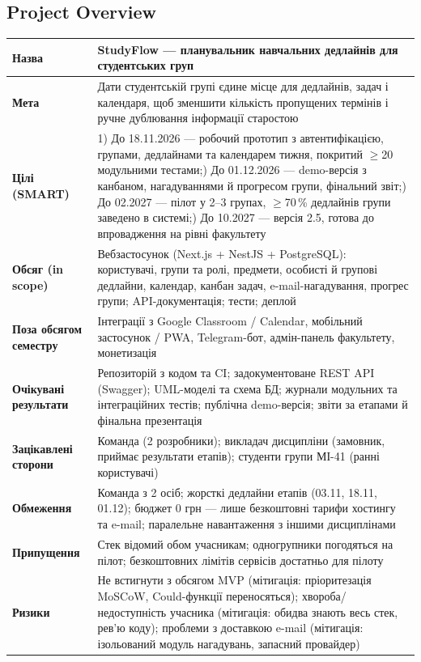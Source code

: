 \documentclass[12pt]{article}
\begin{document}
\subsection{Project Overview}
\begin{tabularx}{\textwidth}{L{3.4cm} Y}
\toprule
\textbf{Назва} & StudyFlow --- планувальник навчальних дедлайнів для студентських груп\\
\midrule
\textbf{Мета} & Дати студентській групі єдине місце для дедлайнів, задач і календаря, щоб зменшити кількість пропущених термінів і ручне дублювання інформації старостою\\
\midrule
\textbf{Цілі (SMART)} &
1) До 18.11.2026 --- робочий прототип з автентифікацією, групами, дедлайнами та календарем тижня, покритий $\geq$20 модульними тестами;) До 01.12.2026 --- demo-версія з канбаном, нагадуваннями й прогресом групи, фінальний звіт;) До 02.2027 --- пілот у 2--3 групах, $\geq$70\,\% дедлайнів групи заведено в системі;) До 10.2027 --- версія 2.5, готова до впровадження на рівні факультету\\
\midrule
\textbf{Обсяг (in scope)} & Вебзастосунок (Next.js + NestJS + PostgreSQL): користувачі, групи та ролі, предмети, особисті й групові дедлайни, календар, канбан задач, e-mail-нагадування, прогрес групи; API-документація; тести; деплой\\
\midrule
\textbf{Поза обсягом семестру} & Інтеграції з Google Classroom / Calendar, мобільний застосунок / PWA, Telegram-бот, адмін-панель факультету, монетизація\\
\midrule
\textbf{Очікувані результати} & Репозиторій з кодом та CI; задокументоване REST API (Swagger); UML-моделі та схема БД; журнали модульних та інтеграційних тестів; публічна demo-версія; звіти за етапами й фінальна презентація\\
\midrule
\textbf{Зацікавлені сторони} & Команда (2 розробники); викладач дисципліни (замовник, приймає результати етапів); студенти групи МІ-41 (ранні користувачі)\\
\midrule
\textbf{Обмеження} & Команда з 2 осіб; жорсткі дедлайни етапів (03.11, 18.11, 01.12); бюджет 0 грн --- лише безкоштовні тарифи хостингу та e-mail; паралельне навантаження з іншими дисциплінами\\
\midrule
\textbf{Припущення} & Стек відомий обом учасникам; одногрупники погодяться на пілот; безкоштовних лімітів сервісів достатньо для пілоту\\
\midrule
\textbf{Ризики} & Не встигнути з обсягом MVP (мітигація: пріоритезація MoSCoW, Could-функції переносяться); хвороба/недоступність учасника (мітигація: обидва знають весь стек, рев'ю коду); проблеми з доставкою e-mail (мітигація: ізольований модуль нагадувань, запасний провайдер)\\
\bottomrule
\end{tabularx}
\end{document}
